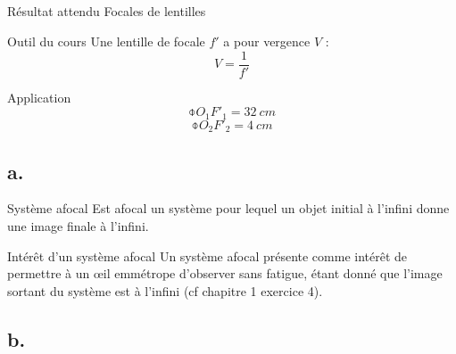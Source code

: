 \documentclass[../main/main.tex]{subfiles}
\begin{document}
\subsection{}

\begin{tcbraster}[raster columns=3, raster equal height=rows]
    \begin{NCprop}{Résultat attendu}
        Focales de lentilles
    \end{NCprop}
    \begin{NCdemo}{Outil du cours}
        Une lentille de focale $f'$ a pour vergence $V$ :
        \[ V = \frac{1}{f'} \]
    \end{NCdemo}
    \begin{NCexem}{Application}
        \[ \boxed{\obar{O_1F'_1} = \SI{32}{cm}} \]
        \[ \boxed{\obar{O_2F'_2} = \SI{4}{cm}} \]
    \end{NCexem}
\end{tcbraster}

\subsection{a.}
\begin{tcbraster}[raster columns=2, raster equal height=rows]
    \begin{defi}{Système afocal}
        Est afocal un système pour lequel un objet initial à l'infini donne une
        image finale à l'infini.
    \end{defi}
    \begin{inte}{Intérêt d'un système afocal}
        Un système afocal présente comme intérêt de permettre à un œil emmétrope
        d'observer sans fatigue, étant donné que l'image sortant du système est à
        l'infini (cf chapitre 1 exercice 4).
    \end{inte}
\end{tcbraster}

\setcounter{subsection}{1}
\subsection{b.}
\end{document}
